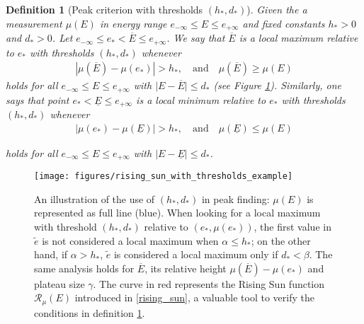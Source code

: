 \documentclass[%
 reprint,
 amsmath,amssymb,
 aps,
]{revtex4-1}
\newtheorem{Definition}[Lemma]{Definition}
\begin{document}
\begin{Definition}[Peak criterion with thresholds $(h_*,d_*)$] \label{def:rising_sun} Given the a measurement $\mu(E)$ in energy range $e_{-\infty}\leq E\leq e_{+\infty}$ and fixed constants $h_*>0$ and $d_*>0$. Let $e_{-\infty}\leq e_*<\overline{E} \leq e_{+\infty}$. We say that $\overline{E}$ is a local maximum relative to $e_*$ with thresholds $(h_*,d_*)$ whenever
%
\begin{align}\label{def:loc_max1}
 \left\vert\mu\left(\overline{E}\right) - \mu(e_*)\right\vert >h_*, \quad\mbox{and} \quad \mu\left(\overline{E}\right) \geq \mu(E)
\end{align} 
%
holds for all  $e_{-\infty} \leq E\leq e_{+\infty}$ with $\vert E - \overline{E}\vert \leq d_*$ (see Figure \ref{fig:threshold_slecting_peaks}). Similarly, one says that point $e_*< \underline{E}\leq e_{+\infty}$ is a local minimum relative to $e_*$ with thresholds $(h_*,d_*)$ whenever
%
\begin{align}\label{def:loc_max1}
 \left\vert\mu(e_*) - \mu\left(\underline{E}\right) \right\vert>h_*, \quad \mbox{and} \quad \mu\left(\underline{E}\right) \leq \mu(E)
\end{align} 

%
holds for all  $e_{-\infty} \leq E\leq e_{+\infty}$ with $\vert E - \underline{E}\vert \leq d_*$.
\end{Definition}
%
\begin{figure}[htb]
 \texttt{[image: figures/rising\_sun\_with\_thresholds\_example]}
 \caption{An illustration of the use of $(h_*, d_*)$ in peak finding:  $\mu(E)$ is represented as full line (blue). When looking for a local maximum with threshold $(h_*,d_*)$ relative to $(e_*,\mu(e_*))$, the first value in $\widetilde{e}$ is not considered a local maximum when $\alpha \leq h_*$; on the other hand, if $\alpha >h_*$, $\widetilde{e}$ is considered a local maximum only if $d_* <\beta$. The same analysis holds for $\overline{E}$, its relative height $\mu\left(\overline{E}\right) - \mu(e_*)$ and plateau size $\gamma$. The curve in  red represents the  Rising Sun function $\mathcal{R}_{\mu}(E)$ introduced in \eqref{rising_sun}, a valuable tool to verify the conditions in definition \ref{def:rising_sun}.\label{fig:threshold_slecting_peaks}}
\end{figure}
%
\end{document}
